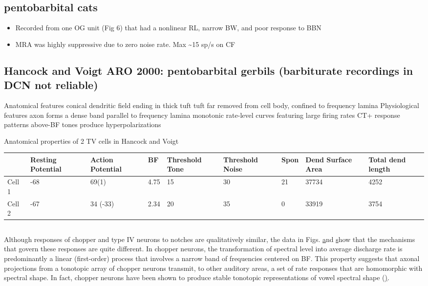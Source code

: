 \documentclass[10pt,a4paper]{article}
\begin{document}
\subsection{\citep{RhodeGreenberg:1994a} pentobarbital cats}


\begin{itemize}
\item Recorded from one OG unit (Fig 6) that had a nonlinear RL, narrow BW, and
  poor response to BBN
\item MRA was highly suppressive due to zero noise rate. Max \~{}15 sp/s on CF
\end{itemize}

\subsection{Hancock and Voigt ARO 2000: pentobarbital gerbils (barbiturate recordings in DCN
not reliable)}

Anatomical features
conical dendritic field ending in thick tuft
tuft far removed from cell body, confined to frequency lamina
Physiological features
axon forms a dense band parallel to frequency lamina
monotonic rate-level curves featuring large firing rates
CT+ response patterns
above-BF tones produce hyperpolarizations

Anatomical properties of 2 TV cells in Hancock and Voigt

\begin{flushleft}

  \begin{tabularx}{\textwidth}{XXXXXXXXX}
\toprule
       & Resting Potential & Action Potential  &  BF  & Threshold Tone & Threshold Noise
       &       Spon        & Dend Surface Area & Total dend length\\\midrule
Cell 1 &       {}-68       &       69(1)       & 4.75 &       15       & 30 & 21 & 37734 & 4252\\
Cell 2 &       {}-67       &     34 (-33)      & 2.34 &       20       & 35 & 0  & 33919 & 3754\\
\bottomrule
\end{tabularx}
\end{flushleft}


\subsection{\citep{YuYoung:2000}}

Although responses of chopper and type IV neurons to notches are qualitatively
similar, the data in Figs.
\href{www.pnas.org/cgi/content/full/97/22/11780#F5}
and
\href{www.pnas.org/cgi/content/full/97/22/11780#F6}
show that the mechanisms that govern these responses are quite different. In
chopper neurons, the transformation of spectral level into average discharge
rate is predominantly a linear (first-order) process that involves a narrow band
of frequencies centered on BF. This property suggests that axonal projections
from a tonotopic array of chopper neurons transmit, to other auditory areas, a
set of rate responses that are homomorphic with spectral shape. In fact, chopper
neurons have been shown to produce stable tonotopic representations of vowel
spectral shape
(\href{www.pnas.org/cgi/content/full/97/22/11780#B8}).
\end{document}
